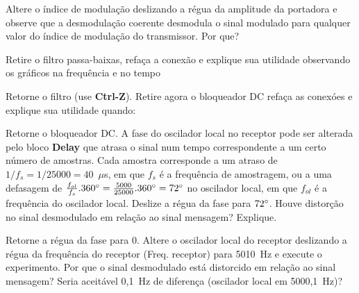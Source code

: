 \documentclass[12pt,addpoints]{exam}
\begin{document}
\begin{questions}
  

  
    \question Altere o índice de modulação deslizando a régua da amplitude da portadora e observe que a desmodulação coerente desmodula o sinal modulado para qualquer valor do índice de modulação do transmissor. Por que?
    \fillwithlines{0.5in}

   \question Retire o filtro passa-baixas, refaça a conexão e explique sua utilidade observando os gráficos na frequência e no tempo
   \fillwithlines{0.5in}

   \question Retorne o filtro (use {\bf Ctrl-Z}). Retire agora o bloqueador DC refaça as conexóes e explique sua utilidade quando:
   \fillwithlines{1in}
   

    \question Retorne o bloqueador DC. A fase do oscilador local no receptor pode ser alterada pelo bloco \textbf{Delay} que atrasa o sinal num tempo correspondente a um certo número de amostras. Cada amostra corresponde a um atraso de $1/f_{s} = 1/25000 =  40$~$\mu$s, em que $f_{s}$ é a frequência de amostragem, ou a uma defasagem de $\frac{f_{ol}}{f_{s}}.360\degree = \frac{5000}{25000}.360\degree = 72\degree$ no oscilador local, em que $f_{ol}$ é a frequência do oscilador local. Deslize a régua da fase para $72\degree$. Houve distorção no sinal desmodulado em relação ao sinal mensagem? Explique.
    \fillwithlines{0.5in}
    
    \question Retorne a régua da fase para 0\degree. Altere o oscilador local do receptor deslizando a régua da frequência do receptor (Freq. receptor) para 5010~Hz e execute o experimento. Por que o sinal desmodulado está distorcido em relação ao sinal mensagem? Seria aceitável 0,1~Hz de diferença (oscilador local em 5000,1~Hz)?
    \fillwithlines{0.75in}
\end{questions}
\end{document}
